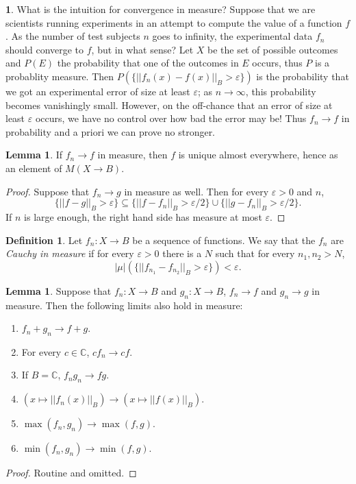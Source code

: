 \documentclass[12pt]{book}
\newcommand{\CC}{\mathbb{C}}
\newcommand{\dfn}[1]{\emph{#1}\index{#1}}
\theoremstyle{definition}
\newtheorem{lemma}[theorem]{Lemma}
\newtheorem{subsec}[theorem]{}
\newtheorem{definition}[theorem]{Definition}
\begin{document}
\begin{subsec}
What is the intuition for convergence in measure?
Suppose that we are scientists running experiments in an attempt to compute the value of a function $f$.
As the number of test subjects $n$ goes to infinity, the experimental data $f_n$ should converge to $f$, but in what sense?
Let $X$ be the set of possible outcomes and $P(E)$ the probability that one of the outcomes in $E$ occurs, thus $P$ is a probablity measure. Then $P(\{||f_n(x) - f(x)||_B > \varepsilon\})$
is the probability that we got an experimental error of size at least $\varepsilon$; as $n \to \infty$, this probability becomes vanishingly small.
However, on the off-chance that an error of size at least $\varepsilon$ occurs, we have no control over how bad the error may be!
Thus $f_n \to f$ in probability and a priori we can prove no stronger.
\end{subsec}

\begin{lemma}
\label{conv in measure is hausdorff}
If $f_n \to f$ in measure, then $f$ is unique almost everywhere, hence as an element of $M(X \to B)$.
\end{lemma}
\begin{proof}
Suppose that $f_n \to g$ in measure as well. Then for every $\varepsilon > 0$ and $n$,
$$\{||f - g||_B > \varepsilon\} \subseteq \{||f - f_n||_B > \varepsilon/2\} \cup \{||g - f_n||_B   > \varepsilon/2\}.$$
If $n$ is large enough, the right hand side has measure at most $\varepsilon$.
\end{proof}

\begin{definition}
Let $f_n: X \to B$ be a sequence of functions. We say that the $f_n$ are \dfn{Cauchy in measure} if for every $\varepsilon > 0$ there is a $N$ such that for every $n_1, n_2 > N$,
$$|\mu|(\{||f_{n_1} - f_{n_2}||_B > \varepsilon\}) < \varepsilon.$$
\end{definition}

\begin{lemma}
Suppose that $f_n: X \to B$ and $g_n: X \to B$, $f_n \to f$ and $g_n \to g$ in measure. Then the following limits also hold in measure:
\begin{enumerate}
\item $f_n + g_n \to f + g$.
\item For every $c \in \CC$, $cf_n \to cf$.
\item If $B = \CC$, $f_ng_n \to fg$.
\item $(x \mapsto ||f_n(x)||_B) \to (x \mapsto ||f(x)||_B)$.
\item $\max(f_n, g_n) \to \max(f, g)$.
\item $\min(f_n, g_n) \to \min(f, g)$.
\end{enumerate}
\end{lemma}
\begin{proof}
Routine and omitted.
\end{proof}
\end{document}
